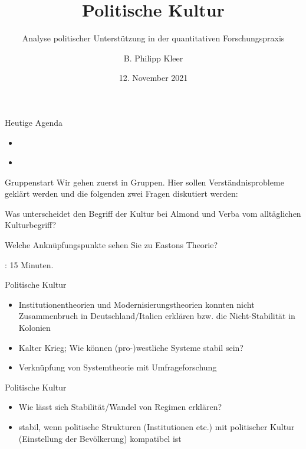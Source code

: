 \documentclass[11pt]{beamer}
\title{Politische Kultur}
\subtitle{Analyse politischer Unterstützung in der quantitativen Forschungspraxis}
\date{12. November 2021}
\author{B. Philipp Kleer}
\institute{Institut für Politikwissenschaft | Justus-Liebig-Universität Gießen}
\begin{document}
\begin{frame}
	\titlepage
\end{frame}

\begin{frame}[t]{Heutige Agenda}
	\begin{itemize}
		\item \cite{Almond1963}
		\item \cite{Gabriel2009}
	\end{itemize}
\end{frame}

\begin{frame}[t]{Gruppenstart}
	Wir gehen zuerst in Gruppen. Hier sollen Verständnisprobleme geklärt werden und die folgenden zwei Fragen diskutiert werden:
	
	\begin{nolist}
		\item Was unterscheidet den Begriff der Kultur bei Almond und Verba vom alltäglichen Kulturbegriff?
		\item Welche Anknüpfungspunkte sehen Sie zu Eastons Theorie?
	\end{nolist}
	
	: 15 Minuten.
\end{frame}

\begin{frame}[t]{Politische Kultur}
	\begin{itemize}
		\item Institutionentheorien und Modernisierungstheorien konnten nicht Zusammenbruch in Deutschland/Italien erklären bzw. die Nicht-Stabilität in Kolonien \pause
	\end{itemize}
	
	\begin{itemize}
		\item Kalter Krieg; Wie können (pro-)westliche Systeme stabil sein?
		\item Verknüpfung von Systemtheorie mit Umfrageforschung
	\end{itemize}
\end{frame}

\begin{frame}[t]{Politische Kultur}
	\begin{itemize}
		\item Wie lässt sich Stabilität/Wandel von Regimen erklären? \pause
	\end{itemize}
	
	\begin{itemize}
		\item stabil, wenn politische Strukturen (Institutionen etc.) mit politischer Kultur (Einstellung der Bevölkerung) kompatibel ist
	\end{itemize}
\end{frame}
\end{document}
